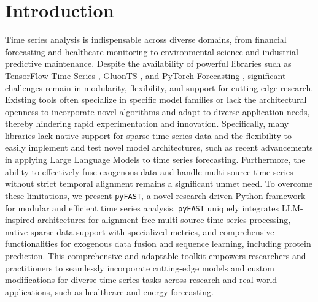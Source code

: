 \documentclass[twoside,11pt]{article}
\begin{document}
\section{Introduction}
Time series analysis is indispensable across diverse domains, from financial forecasting and healthcare monitoring to environmental science and industrial predictive maintenance. Despite the availability of powerful libraries such as TensorFlow Time Series \citep{abadi2016tensorflow}, GluonTS \citep{alexandrov2020gluonts}, and PyTorch Forecasting \citep{paszke2019pytorch}, significant challenges remain in modularity, flexibility, and support for cutting-edge research. Existing tools often specialize in specific model families or lack the architectural openness to incorporate novel algorithms and adapt to diverse application needs, thereby hindering rapid experimentation and innovation. Specifically, many libraries lack native support for sparse time series data and the flexibility to easily implement and test novel model architectures, such as recent advancements in applying Large Language Models to time series forecasting.  Furthermore, the ability to effectively fuse exogenous data and handle multi-source time series without strict temporal alignment remains a significant unmet need. To overcome these limitations, we present \texttt{pyFAST}, a novel research-driven Python framework for modular and efficient time series analysis.  \texttt{pyFAST} uniquely integrates LLM-inspired architectures for alignment-free multi-source time series processing, native sparse data support with specialized metrics, and comprehensive functionalities for exogenous data fusion and sequence learning, including protein prediction. This comprehensive and adaptable toolkit empowers researchers and practitioners to seamlessly incorporate cutting-edge models and custom modifications for diverse time series tasks across research and real-world applications, such as healthcare and energy forecasting.
\end{document}
